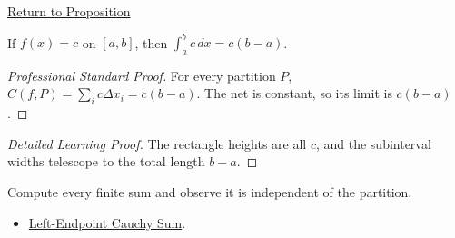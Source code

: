 \newpage
{}
\label{prf:cauchy-integral-constant}
\begin{remark*}[Return]\hyperref[prop:cauchy-integral-constant]{Return to Proposition}\end{remark*}
\begin{proposition*}
If \(f(x)=c\) on \([a,b]\), then \(\int_a^b c\,dx=c(b-a)\).
\end{proposition*}
\begin{proof}[Professional Standard Proof]
\LRAProofBodyStart
For every partition \(P\), \(C(f,P)=\sum_i c\Delta x_i=c(b-a)\). The net is
constant, so its limit is \(c(b-a)\).
\end{proof}
\begin{proof}[Detailed Learning Proof]
\LRAProofBodyStart
The rectangle heights are all \(c\), and the subinterval widths telescope to
the total length \(b-a\).
\end{proof}
\begin{remark*}
Compute every finite sum and observe it is independent of the partition.
\end{remark*}
\begin{dependencies}
\begin{itemize}
  \item \hyperref[def:cauchy-sum]{Left-Endpoint Cauchy Sum}.
\end{itemize}
\end{dependencies}
\clearpage
